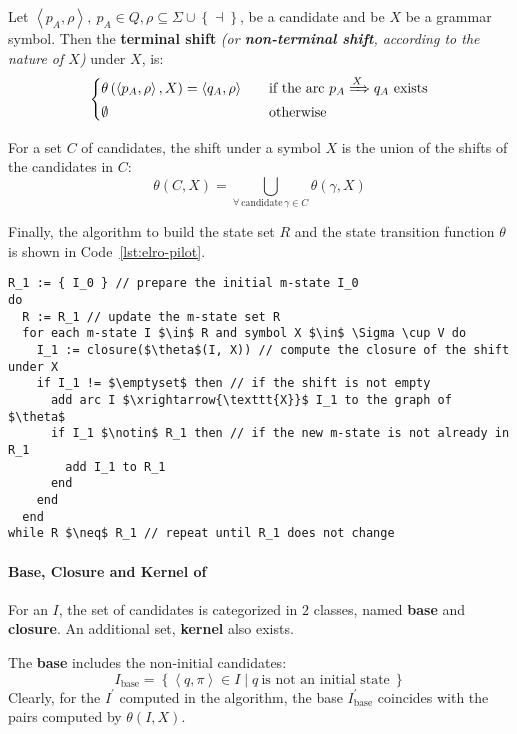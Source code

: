 \documentclass[english]{article}
\begin{document}
Let \(\left\langle p_A, \rho \right\rangle, \ p_A \in Q, \rho \subseteq \Sigma \cup \left\{ \dashv \right\}\), be a candidate and be \(X\) be a grammar symbol.
Then the \textbf{terminal shift} \textit{(or \textbf{non-terminal shift}, according to the nature of \(X\))} under \(X\), is:
\[\begin{cases}
    \theta \left( \left\langle p_A, \rho \right\rangle, X \right) = \left\langle q_A, \rho \right\rangle \quad & \text{if the arc} \ p_A \xRightarrow{X} q_A \ \text{exists} \\
    \emptyset \quad                                                                                            & \text{otherwise}
  \end{cases}\]

For a set \(C\) of candidates, the shift under a symbol \(X\) is the union of the shifts of the candidates in \(C\):
\[ \theta(C, X) = \bigcup_{\forall \, \text{candidate} \, \gamma \in C} \theta(\gamma, X) \]

Finally, the algorithm to build the state set \(R\) and the state transition function \(\theta\) is shown in Code~\ref{lst:elro-pilot}.

\begin{lstlisting}[caption={Algorithm to build the \elro pilot automaton}, label={lst:elro-pilot}]
R_1 := { I_0 } // prepare the initial m-state I_0
do
  R := R_1 // update the m-state set R
  for each m-state I $\in$ R and symbol X $\in$ \Sigma \cup V do
    I_1 := closure($\theta$(I, X)) // compute the closure of the shift under X
    if I_1 != $\emptyset$ then // if the shift is not empty
      add arc I $\xrightarrow{\texttt{X}}$ I_1 to the graph of $\theta$
      if I_1 $\notin$ R_1 then // if the new m-state is not already in R_1
        add I_1 to R_1
      end
    end
  end
while R $\neq$ R_1 // repeat until R_1 does not change
\end{lstlisting}

\paragraph[Base, Closure and Kernel of m-state]{Base, Closure and Kernel of \mstate}
\label{par:base-closure-kernel}

For an \mstate \(I\), the set of candidates is categorized in \(2\) classes, named \textbf{base} and \textbf{closure}.
An additional set, \textbf{kernel} also exists.

\begin{definition}
  The \textbf{base} includes the non-initial candidates:
  \[ I_{\text{base}} = \left\{ \left\langle q, \pi \right\rangle \in I \mid q \ \text{is not an initial state} \ \right\} \]
  Clearly, for the \mstate \(I^\prime\) computed in the algorithm, the base \(I^\prime_{\text{base}}\) coincides with the pairs computed by \(\theta(I, X)\).
\end{definition}
\end{document}
